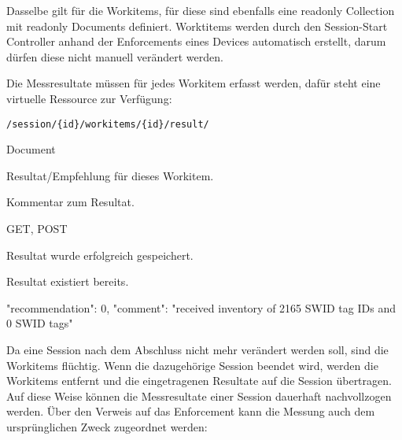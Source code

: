 Dasselbe gilt für die Workitems, für diese sind ebenfalls eine readonly
Collection mit readonly Documents definiert. Worktitems werden durch den
Session-Start Controller anhand der Enforcements eines Devices automatisch
erstellt, darum dürfen diese nicht manuell verändert werden.

Die Messresultate müssen für jedes Workitem erfasst werden, dafür steht eine
virtuelle Ressource zur Verfügung:

\begin{mdframed}[style=def]
\begin{description*}
	\item[URI Path] \texttt{/session/\{id\}/workitems/\{id\}/result/}
	\item[Archetype] Document
	\item[Request Parameter] \hfill
	\begin{description*}
		\item[\texttt{recommendation}] Resultat/Empfehlung für dieses Workitem.
		\item[\texttt{comment}] Kommentar zum Resultat.
	\end{description*}
	\item[Methods] GET, POST
	\item[Response Statuscodes] \hfill
		\begin{description*}
			\item[201 Created] Resultat wurde erfolgreich gespeichert.
			\item[409 Conflict] Resultat existiert bereits.
		\end{description*}
	\item[JSON Format Response] \hfill
\begin{jsoncode}
{
	"recommendation": 0,
	"comment": "received inventory of 2165 SWID tag IDs and 0 SWID tags"
}
\end{jsoncode}
\end{description*}
\end{mdframed}

Da eine Session nach dem Abschluss nicht mehr verändert werden soll, sind die
Workitems flüchtig. Wenn die dazugehörige Session beendet wird, werden die
Workitems entfernt und die eingetragenen Resultate auf die Session übertragen.
Auf diese Weise können die Messresultate einer Session dauerhaft nachvollzogen
werden. Über den Verweis auf das Enforcement kann die Messung auch dem
ursprünglichen Zweck zugeordnet werden:

